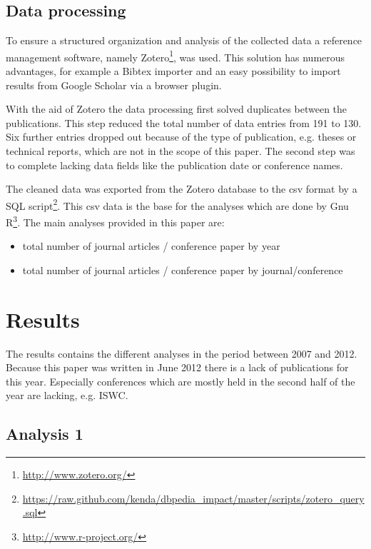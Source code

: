 \documentclass[english]{lni}
\begin{document}
\subsection{Data processing}
\label{sec-2-2}

   To ensure a structured organization and analysis of the collected data a
   reference management software, namely Zotero\footnote{\href{http://www.zotero.org/}{http://www.zotero.org/} }, was used. This solution
   has numerous advantages, for example a Bibtex importer and an easy possibility to import
   results from Google Scholar via a browser plugin.

   With the aid of Zotero the data processing first solved duplicates between
   the publications. This step reduced the total number of data entries from 191
   to 130. Six further entries dropped out because of the type of publication,
   e.g. theses or technical reports, which are not in the scope of this
   paper. The second step was to complete lacking data fields like the
   publication date or conference names.

   The cleaned data was exported from the Zotero database to the csv format by a
   SQL script\footnote{\href{https://raw.github.com/kenda/dbpedia_impact/master/scripts/zotero_query.sql}{https://raw.github.com/kenda/dbpedia\_impact/master/scripts/zotero\_query.sql} }. This csv data is the base for the analyses which are done by
   Gnu R\footnote{\href{http://www.r-project.org/}{http://www.r-project.org/} }. The main analyses provided in this paper are:
\begin{itemize}
\item total number of journal articles / conference paper by year
\item total number of journal articles / conference paper by journal/conference
\end{itemize}
\section{Results}
\label{sec-3}

  The results contains the different analyses in the period between 2007
  and 2012. Because this paper was written in June 2012 there is a lack of
  publications for this year. Especially conferences which are mostly held in the
  second half of the year are lacking, e.g. ISWC.
\subsection{Analysis 1}
\label{sec-3-1}
\end{document}
